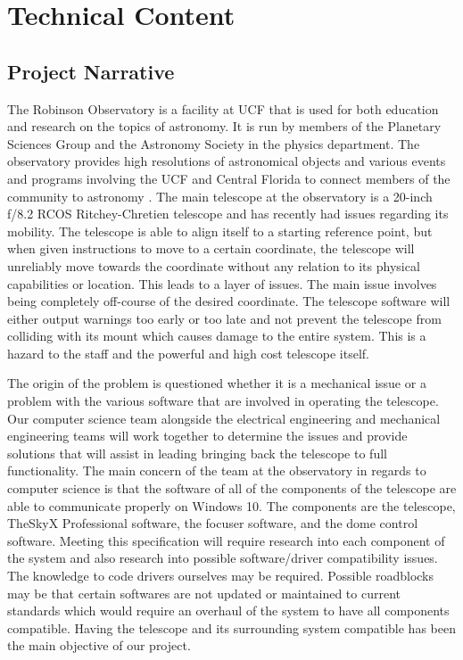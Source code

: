 \documentclass[12pt]{article}
\begin{document}
\section{Technical Content}

\subsection{Project Narrative}

The Robinson Observatory is a facility at UCF that is used for both education and research on the topics of astronomy.  It is run by members of the Planetary Sciences Group and the Astronomy Society in the physics department.  The observatory provides high resolutions of astronomical objects and various events and programs involving the UCF and Central Florida to connect members of the community to astronomy .  The main telescope at the observatory is a 20-inch f/8.2 RCOS Ritchey-Chretien telescope and has recently had issues regarding its mobility.  The telescope is able to align itself to a starting reference point, but when given instructions to move to a certain coordinate, the telescope will unreliably move towards the coordinate without any relation to its physical capabilities or location.  This leads to a layer of issues.  The main issue involves being completely off-course of the desired coordinate.  The telescope software will either output warnings too early or too late and not prevent the telescope from colliding with its mount which causes damage to the entire system.  This is a hazard to the staff and the powerful and high cost telescope itself.

The origin of the problem is questioned whether it is a mechanical issue or a problem with the various software that are involved in operating the telescope.  Our computer science team alongside the electrical engineering and mechanical engineering teams will work together to determine the issues and provide solutions that will assist in leading bringing back the telescope to full functionality.  The main concern of the team at the observatory in regards to computer science is that the software of all of the components of the telescope are able to communicate properly on Windows 10.  The components are the telescope, TheSkyX Professional software, the focuser software, and the dome control software.  Meeting this specification will require research into each component of the system and also research into possible software/driver compatibility issues.  The knowledge to code drivers ourselves may be required.  Possible roadblocks may be that certain softwares are not updated or maintained to current standards which would require an overhaul of the system to have all components compatible.  Having the telescope and its surrounding system compatible has been the main objective of our project.
\end{document}
